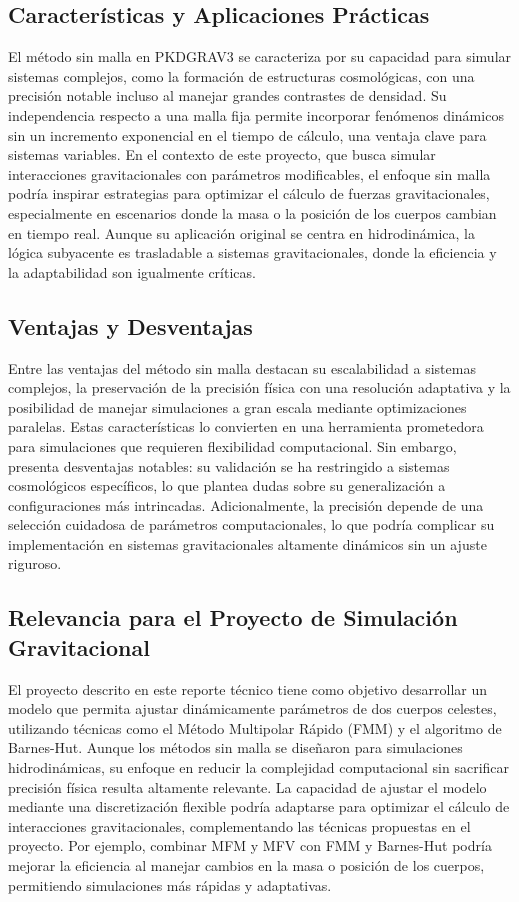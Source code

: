 \subsection{Características y Aplicaciones Prácticas}

El método sin malla en PKDGRAV3 se caracteriza por su capacidad para simular sistemas complejos, como la formación de estructuras cosmológicas, con una precisión notable incluso al manejar grandes contrastes de densidad. Su independencia respecto a una malla fija permite incorporar fenómenos dinámicos sin un incremento exponencial en el tiempo de cálculo, una ventaja clave para sistemas variables. En el contexto de este proyecto, que busca simular interacciones gravitacionales con parámetros modificables, el enfoque sin malla podría inspirar estrategias para optimizar el cálculo de fuerzas gravitacionales, especialmente en escenarios donde la masa o la posición de los cuerpos cambian en tiempo real. Aunque su aplicación original se centra en hidrodinámica, la lógica subyacente es trasladable a sistemas gravitacionales, donde la eficiencia y la adaptabilidad son igualmente críticas.

\subsection{Ventajas y Desventajas}

Entre las ventajas del método sin malla destacan su escalabilidad a sistemas complejos, la preservación de la precisión física con una resolución adaptativa y la posibilidad de manejar simulaciones a gran escala mediante optimizaciones paralelas. Estas características lo convierten en una herramienta prometedora para simulaciones que requieren flexibilidad computacional. Sin embargo, presenta desventajas notables: su validación se ha restringido a sistemas cosmológicos específicos, lo que plantea dudas sobre su generalización a configuraciones más intrincadas. Adicionalmente, la precisión depende de una selección cuidadosa de parámetros computacionales, lo que podría complicar su implementación en sistemas gravitacionales altamente dinámicos sin un ajuste riguroso.

\subsection{Relevancia para el Proyecto de Simulación Gravitacional}

El proyecto descrito en este reporte técnico tiene como objetivo desarrollar un modelo que permita ajustar dinámicamente parámetros de dos cuerpos celestes, utilizando técnicas como el Método Multipolar Rápido (FMM) y el algoritmo de Barnes-Hut. Aunque los métodos sin malla se diseñaron para simulaciones hidrodinámicas, su enfoque en reducir la complejidad computacional sin sacrificar precisión física resulta altamente relevante. La capacidad de ajustar el modelo mediante una discretización flexible podría adaptarse para optimizar el cálculo de interacciones gravitacionales, complementando las técnicas propuestas en el proyecto. Por ejemplo, combinar MFM y MFV con FMM y Barnes-Hut podría mejorar la eficiencia al manejar cambios en la masa o posición de los cuerpos, permitiendo simulaciones más rápidas y adaptativas.

